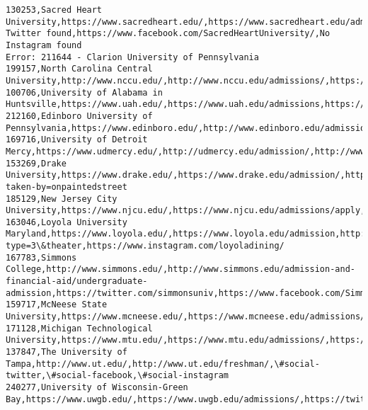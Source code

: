 \documentclass[11pt]{article}
\begin{document}
\begin{Verbatim}[commandchars=\\\{\}]
130253,Sacred Heart University,https://www.sacredheart.edu/,https://www.sacredheart.edu/admissions/undergraduateadmissions/,No Twitter found,https://www.facebook.com/SacredHeartUniversity/,No Instagram found
Error: 211644 - Clarion University of Pennsylvania
199157,North Carolina Central University,http://www.nccu.edu/,http://www.nccu.edu/admissions/,https://twitter.com/NCCU,http://www.facebook.com/nccueagle,http://instagram.com/nccueagle
100706,University of Alabama in Huntsville,https://www.uah.edu/,https://www.uah.edu/admissions,https://twitter.com/uahuntsville,https://www.facebook.com/UAHuntsville,https://www.instagram.com/uahuntsville/
212160,Edinboro University of Pennsylvania,https://www.edinboro.edu/,http://www.edinboro.edu/admissions/,http://www.twitter.com/edinboro,http://www.facebook.com/edinboro,https://instagram.com/edinborou/
169716,University of Detroit Mercy,https://www.udmercy.edu/,http://udmercy.edu/admission/,http://www.twitter.com/UDMDetroit/,http://www.facebook.com/udmercy,https://www.instagram.com/udmdetroit/
153269,Drake University,https://www.drake.edu/,https://www.drake.edu/admission/,https://www.twitter.com/DrakeUniversity,https://www.facebook.com/DrakeUniversity,https://www.instagram.com/p/Bk5kKGplaGM/?taken-by=onpaintedstreet
185129,New Jersey City University,https://www.njcu.edu/,https://www.njcu.edu/admissions/apply,https://twitter.com/InvestorsBank,https://www.facebook.com/NewJerseyCityUniversity,https://www.instagram.com/p/BgWe3AJgJaq/
163046,Loyola University Maryland,https://www.loyola.edu/,https://www.loyola.edu/admission,http://twitter.com/loyolamaryland,https://www.facebook.com/LoyolaHoundBots/photos/a.1686897701416569/1686898288083177/?type=3\&theater,https://www.instagram.com/loyoladining/
167783,Simmons College,http://www.simmons.edu/,http://www.simmons.edu/admission-and-financial-aid/undergraduate-admission,https://twitter.com/simmonsuniv,https://www.facebook.com/SimmonsUniversity,https://www.instagram.com/simmonsuniversity/
159717,McNeese State University,https://www.mcneese.edu/,https://www.mcneese.edu/admissions/,https://twitter.com/mcneese,https://www.facebook.com/McNeeseStateU/,https://www.instagram.com/mcneese/
171128,Michigan Technological University,https://www.mtu.edu/,https://www.mtu.edu/admissions/,https://www.twitter.com/MichiganTech,https://www.facebook.com/MichiganTech,https://instagram.com/michigantech
137847,The University of Tampa,http://www.ut.edu/,http://www.ut.edu/freshman/,\#social-twitter,\#social-facebook,\#social-instagram
240277,University of Wisconsin-Green Bay,https://www.uwgb.edu/,https://www.uwgb.edu/admissions/,https://twitter.com/uwgb,https://www.facebook.com/uwgreenbay,https://instagram.com/explore/tags/uwgb/

\end{Verbatim}
\end{document}
